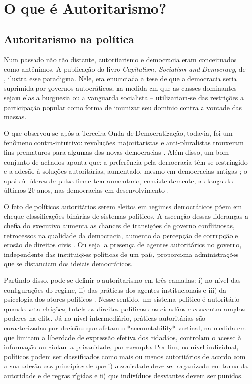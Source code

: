\documentclass[
12pt,				%
openright,			%
twoside,			%
a4paper,			%
english,			%
french,				%
spanish,			%
brazil				%
]{abntex2}
\begin{document}
\chapter{O que é Autoritarismo?}\label{referencial_teorico}

\section{Autoritarismo na política}

Num passado não tão distante, autoritarismo e democracia eram conceituados como antônimos. A publicação do livro \emph{Capitalism, Socialism and Democracy}, de , ilustra esse paradigma. Nele, era enumciada a tese de que a democracia seria suprimida por governos autocráticos, na medida em que  as classes dominantes -- sejam elas a burguesia ou a vanguarda socialista -- utilizariam-se das restrições a participação popular como forma de imunizar seu domínio contra a vontade das massas. 

O que observou-se após a Terceira Onda de Democratização, todavia, foi um fenômeno contra-intuitivo: revoluções majoritaristas e anti-pluralistas trouxeram fins prematuros para algumas das novas democracias \cite{lipset1993reflections}. Além disso, um bom conjunto de achados aponta que: a preferência pela democracia têm se restringido e a adesão à soluções autoritárias, aumentado, mesmo em democracias antigas \cite{foa2016democratic, foa2017signs, foa2017end}; o apoio à líderes de pulso firme tem aumentado, consistentemente, ao longo do últimos 20 anos, nas democracias em desenvolvimento \cite{voeten2016people}.

O fato de políticos autoritários serem eleitos em regimes democráticos põem em cheque classificações binárias de sistemas políticos. A ascenção dessas lideranças a chefia do executivo aumenta as chances de transições de governo conflituosas, retrocessos na qualidade da democracia, aumento da percepção de corrupção e erosão de direitos civis \cite{mounk2018thepopulist}. Ou seja, a presença de agentes autoritários no governo, independente das instituições políticas de um país, proporciona administrações que se distanciam dos ideiais democráticos. 

Partindo disso, pode-se definir o autoritarismo em três camadas: i) no nível das configurações do regime, ii) das práticas dos agentes institucionais e iii) da psicologia dos atores políticos \cite{glasius2018authoritarianism}. Nesse sentido, um sistema político é autoritário quando veta eleições, tutela os direitos políticos dos cidadãos e concentra amplos poderes na elite. Já no nível intermediário, práticas autoritárias são caracterizadas por decisões que afetam o *accountability* vertical, na medida em que limitam a liberdade de expressão efetiva dos cidadãos, controlam o acesso à informação ou violam a privacidade, por exemplo. Por fim, no nível individual, políticos podem ser classificados como mais ou menos autoritários de acordo com a sua adesão aos princípios de que i) a sociedade deve ser organizada em torno da autoridade e de regras rígidas e ii) que indivíduos desviantes devem ser punidos.
\end{document}
